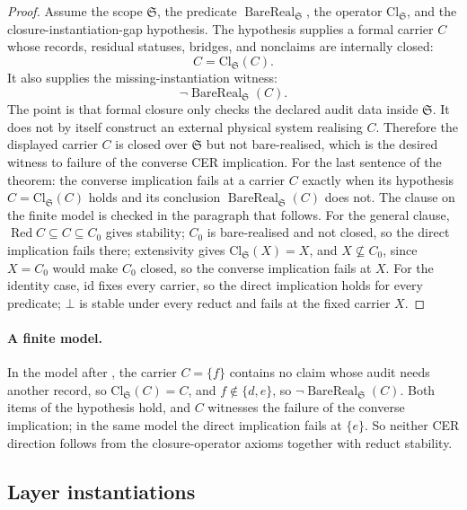 \begin{proof}
Assume the scope \(\mathfrak S\), the predicate
\(\operatorname{BareReal}_{\mathfrak S}\), the operator
\(\mathrm{Cl}_{\mathfrak S}\), and the closure-instantiation-gap
hypothesis.  The hypothesis supplies a formal carrier \(C\) whose
records, residual statuses, bridges, and nonclaims are internally
closed:
\[
  C=\mathrm{Cl}_{\mathfrak S}(C).
\]
It also supplies the missing-instantiation witness:
\[
  \neg\operatorname{BareReal}_{\mathfrak S}(C).
\]
The point is that formal closure only checks the declared audit data
inside \(\mathfrak S\).  It does not by itself construct an external
physical system realising \(C\).  Therefore the displayed carrier
\(C\) is closed over \(\mathfrak S\) but not bare-realised, which is
the desired witness to failure of the converse CER implication. For the
last sentence of the theorem: the converse implication fails at a carrier
\(C\) exactly when its hypothesis \(C=\mathrm{Cl}_{\mathfrak S}(C)\) holds and
its conclusion \(\operatorname{BareReal}_{\mathfrak S}(C)\) does not. The
clause on the finite model is checked in the paragraph that follows. For the
general clause, \(\operatorname{Red}C\subseteq C\subseteq C_0\) gives stability;
\(C_0\) is bare-realised and not closed, so the direct implication fails there;
extensivity gives \(\mathrm{Cl}_{\mathfrak S}(X)=X\), and \(X\not\subseteq C_0\),
since \(X=C_0\) would make \(C_0\) closed, so the converse implication fails
at \(X\).
For the identity case, \(\mathrm{id}\) fixes every carrier, so the direct implication holds for every predicate; \(\bot\) is stable under every reduct and fails at the fixed carrier \(X\).
\end{proof}

\paragraph{A finite model.} In the model after ,
the carrier \(C=\{f\}\) contains no claim whose audit needs another record, so
\(\mathrm{Cl}_{\mathfrak S}(C)=C\), and \(f\notin\{d,e\}\), so
\(\neg\operatorname{BareReal}_{\mathfrak S}(C)\). Both items of the hypothesis
hold, and \(C\) witnesses the failure of the converse implication; in the same
model the direct implication fails at \(\{e\}\). So neither CER direction follows
from the closure-operator axioms together with reduct stability.

\subsection*{Layer instantiations}\label{layer-inst:CER-converse}

